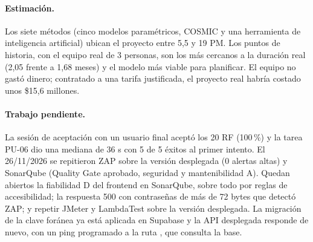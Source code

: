 \paragraph{Estimación.} Los siete métodos (cinco modelos paramétricos, COSMIC y una herramienta de inteligencia artificial) ubican el proyecto entre 5,5 y 19 PM. Los puntos de historia, con el equipo real de 3 personas, son los más cercanos a la duración real (2,05 frente a 1,68 meses) y el modelo más viable para planificar. El equipo no gastó dinero; contratado a una tarifa justificada, el proyecto real habría costado unos \$15,6 millones.

\paragraph{Trabajo pendiente.} La sesión de aceptación con un usuario final aceptó los 20 RF (100\,\%) y la tarea PU-06 dio una mediana de 36 s con 5 de 5 éxitos al primer intento. El 26/11/2026 se repitieron ZAP sobre la versión desplegada (0 alertas altas) y SonarQube (Quality Gate aprobado, seguridad y mantenibilidad A). Quedan abiertos la fiabilidad D del frontend en SonarQube, sobre todo por reglas de accesibilidad; la respuesta 500 con contraseñas de más de 72 bytes que detectó ZAP; y repetir JMeter y LambdaTest sobre la versión desplegada. La migración de la clave foránea ya está aplicada en Supabase y la API desplegada responde de nuevo, con un ping programado a la ruta , que consulta la base.
